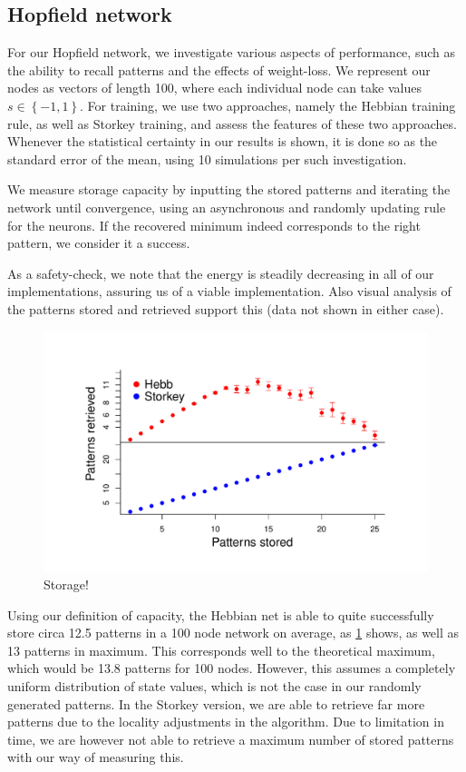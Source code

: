 \documentclass[10pt]{article}
\theoremstyle{plain}
\begin{document}
\begin{multicols*}{2}
\subsection*{Hopfield network}
For our Hopfield network, we investigate various aspects of performance, such as
the ability to recall patterns and the effects of weight-loss. We represent our
nodes as vectors of length 100, where each individual node can take values
$s \in \left\{ -1,1 \right\}$. For training, we use two approaches, namely the
Hebbian training rule, as well as Storkey training, and assess the features of
these two approaches. Whenever the statistical certainty in our results is
shown, it is done so as the standard error of the mean, using 10 simulations per
such investigation.

We measure storage capacity by inputting the stored patterns and iterating the network
until convergence, using an asynchronous and randomly updating rule for the neurons.
If the recovered minimum indeed corresponds to the right pattern, we consider it a
success. 

As a safety-check, we note that the energy is steadily decreasing in all of our
implementations, assuring us of a viable implementation. Also visual analysis of
the patterns stored and retrieved support this (data not shown in either case).

\begin{figure}[H]
  \centering
  \includegraphics[trim={0 1cm 0 1.cm}, clip, scale=.4]{storage}
  \caption{Storage!}
  \label{fig:storage}
\end{figure}

Using our definition of capacity, the Hebbian net is able to quite successfully
store circa 12.5 patterns in a 100 node network on average, as
\cref{fig:storage} shows, as well as 13 patterns in maximum. This corresponds
well to the theoretical maximum, which would be 13.8 patterns for 100 nodes.
However, this assumes a completely uniform distribution of state values, which
is not the case in our randomly generated patterns. In the Storkey version, we
are able to retrieve far more patterns due to the locality adjustments in the
algorithm. Due to limitation in time, we are however not able to retrieve a
maximum number of stored patterns with our way of measuring this.


\end{multicols*}
\end{document}
